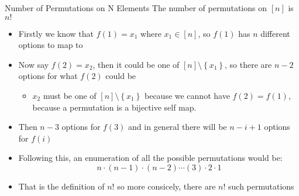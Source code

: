 \documentclass{standalone}
\begin{document}
\begin{theo*}{Number of Permutations on N Elements}
  The number of permutations on $ \left[ n \right]$ is $n!$ 
  \begin{pf}
    \begin{itemize}
      \item Firstly we know that $f\left(1\right) = x_1$ where $x_1 \in  \left[ n \right]$, so $f\left(1\right)$ has $n$ different options to map to
      \item Now say $ f\left(2\right) = x_{2}$, then it could be one of $ \left[ n \right] \setminus \left\{ x_{1} \right\}$, so there are $n-2$ options for what $f\left(2\right)$ could be
        \begin{itemize}
          \item $x_{2}$ must be one of $ \left[ n \right] \setminus \left\{ x_{1} \right\}$ because we cannot have $f\left(2\right)= f\left(1\right)$, because a permutation is a bijective self map.
        \end{itemize}
      \item Then $n-3$ options for $f\left(3\right)$ and in general there will be $n  - i + 1$ options for $f\left(i\right)$
      \item Following this, an enumeration of all the possible permutations would be:
        \[
        n  \cdot \left( n -1 \right)  \cdot  \left( n-2 \right) \dotsb \left( 3 \right)  \cdot 2  \cdot 1
        \]
      \item That is the definition of $n!$ so more consicely, there are $n!$ such permutations
    \end{itemize}
  \end{pf}
\end{theo*}
\end{document}
